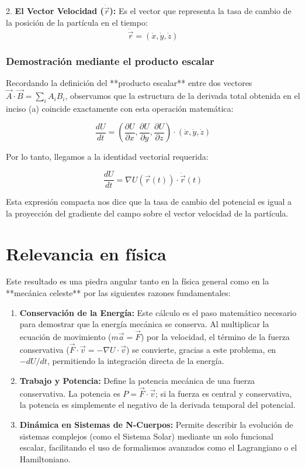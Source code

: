 \documentclass[a4paper]{article}
\begin{document}
2. \textbf{El Vector Velocidad ($\dot{\vec{r}}$):} Es el vector que representa la tasa de cambio de la posición de la partícula en el tiempo:
$$ \dot{\vec{r}} = (\dot{x}, \dot{y}, \dot{z}) $$

\subsubsection{Demostración mediante el producto escalar}

Recordando la definición del **producto escalar** entre dos vectores $\vec{A} \cdot \vec{B} = \sum_{i} A_i B_i$, observamos que la estructura de la derivada total obtenida en el inciso (a) coincide exactamente con esta operación matemática:

$$ \frac{dU}{dt} = \left( \frac{\partial U}{\partial x}, \frac{\partial U}{\partial y}, \frac{\partial U}{\partial z} \right) \cdot (\dot{x}, \dot{y}, \dot{z}) $$

Por lo tanto, llegamos a la identidad vectorial requerida:

$$ \frac{dU}{dt} = \nabla U(\vec{r}(t)) \cdot \dot{\vec{r}}(t) $$

Esta expresión compacta nos dice que la tasa de cambio del potencial es igual a la proyección del gradiente del campo sobre el vector velocidad de la partícula.

\section*{Relevancia en física}

Este resultado es una piedra angular tanto en la física general como en la **mecánica celeste** por las siguientes razones fundamentales:

\begin{enumerate}
    \item \textbf{Conservación de la Energía:} Este cálculo es el paso matemático necesario para demostrar que la energía mecánica se conserva. Al multiplicar la ecuación de movimiento ($m\vec{a} = \vec{F}$) por la velocidad, el término de la fuerza conservativa ($\vec{F} \cdot \vec{v} = -\nabla U \cdot \vec{v}$) se convierte, gracias a este problema, en $-dU/dt$, permitiendo la integración directa de la energía.
    \item \textbf{Trabajo y Potencia:} Define la potencia mecánica de una fuerza conservativa. La potencia es $P = \vec{F} \cdot \vec{v}$; si la fuerza es central y conservativa, la potencia es simplemente el negativo de la derivada temporal del potencial.
    \item \textbf{Dinámica en Sistemas de N-Cuerpos:} Permite describir la evolución de sistemas complejos (como el Sistema Solar) mediante un solo funcional escalar, facilitando el uso de formalismos avanzados como el Lagrangiano o el Hamiltoniano.
\end{enumerate}
\end{document}
